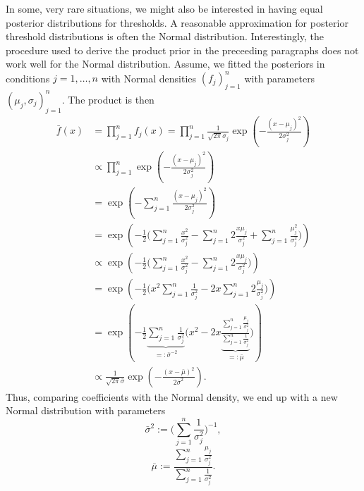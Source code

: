 \documentclass[a4paper,11pt]{scrartcl}
\begin{document}
In some, very rare situations, we might also be interested in having equal posterior distributions for thresholds.
A reasonable approximation for posterior threshold distributions is often the Normal distribution.
Interestingly, the procedure used to derive the product prior in the preceeding paragraphs does not work well for the Normal distribution.
Assume, we fitted the posteriors in conditions $j=1,\dots,n$ with Normal densities $(f_j)_{j=1}^n$ with parameters $(\mu_j,\sigma_j)_{j=1}^n$.
The product is then
%
\begin{align*}
    \bar{f}(x) &= \prod_{j=1}^n f_j(x) = \prod_{j=1}^n \frac{1}{\sqrt{2\pi}\sigma_j} \exp ( - \frac{(x-\mu_j)^2}{2\sigma_j^2})\\
    &\propto \prod_{j=1}^n \exp ( - \frac{(x-\mu_j)^2}{2\sigma_j^2})\\
    &= \exp ( - \sum_{j=1}^n \frac{(x-\mu_j)^2}{2\sigma_j^2} ) \\
    &= \exp ( - \frac{1}{2} \big( \sum_{j=1}^n \frac{x^2}{\sigma_j^2} - \sum_{j=1}^n 2\frac{x\mu_j}{\sigma_j^2} + \sum_{j=1}^n \frac{\mu_j^2}{\sigma_j^2} \big) )\\
    &\propto\exp ( - \frac{1}{2} \big( \sum_{j=1}^n \frac{x^2}{\sigma_j^2} - \sum_{j=1}^n 2\frac{x\mu_j}{\sigma_j^2}\big) ) \\
    &= \exp ( - \frac{1}{2} \big( x^2\sum_{j=1}^n \frac{1}{\sigma_j^2} - 2x\sum_{j=1}^n 2\frac{\mu_j}{\sigma_j^2} \big) ) \\
    &= \exp ( - \frac{1}{2} \underbrace{\sum_{j=1}^n \frac{1}{\sigma_j^2}}_{=:\bar{\sigma}^{-2}} \big( x^2 - 2x\underbrace{\frac{\sum_{j=1}^n \frac{\mu_j}{\sigma_j^2}}{\sum_{j=1}^n \frac{1}{\sigma_j^2}}}_{=:\bar{\mu}}\big) ) \\
    &\propto \frac{1}{\sqrt{2\pi}\bar{\sigma}} \exp( - \frac{(x-\bar{\mu})^2}{2\bar{\sigma}^2}).
\end{align*}
%
Thus, comparing coefficients with the Normal density, we end up with a new Normal distribution with parameters
%
$$
\bar{\sigma}^2 := \big(\sum_{j=1}^n \frac{1}{\sigma_j^2}\big)^{-1},
$$
%
$$
\bar{\mu} := \frac{\sum_{j=1}^n\frac{\mu_j}{\sigma_j^2}}{\sum_{j=1}^n\frac{1}{\sigma_j^2}}.
$$
%
\end{document}
